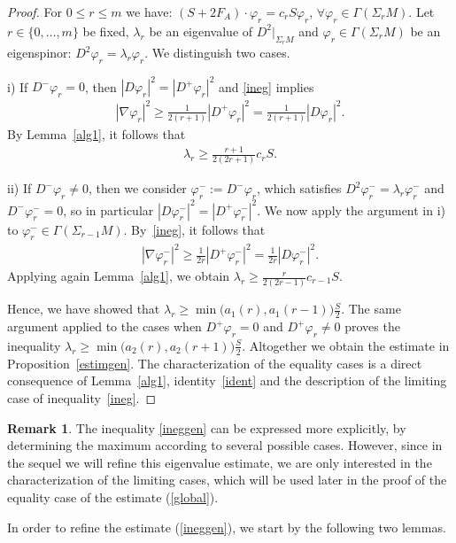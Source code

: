 \documentclass[pdftex]{sigma}
\numberwithin{equation}{section}
\theoremstyle{definition}
\newtheorem{Remark}[thm]{Remark}
\begin{document}
\begin{proof}
For $0\leq r\leq m$ we have: $(S +2 F_A )\cdot \varphi_r = c_r S  \varphi_r$, $\forall\varphi_r\in\Gamma(\Sigma_{r}M)$. Let $r\in\{0,\dots,m\}$ be f\/ixed, $\lambda_r$ be an eigenvalue of $D^2|_{\Sigma_r M}$ and $\varphi_r\in\Gamma(\Sigma_{r}M)$ be an eigenspinor: $D^2\varphi_r=\lambda_r\varphi_r$. We distinguish two cases.

i) If $D^-\varphi_r=0$, then $|D\varphi_r|^2=|D^+\varphi_r|^2$ and \eqref{ineg} implies
\begin{gather*}
|\nabla\varphi_r|^2\geq \frac{1}{2(r+1)}|D^+\varphi_r|^2=\frac{1}{2(r+1)}|D\varphi_r|^2.
\end{gather*}
By Lemma~\ref{alg1},  it follows that
\begin{gather*}\lambda_r\geq\frac{r+1}{2(2r+1)}c_rS. \end{gather*}

 ii) If $D^-\varphi_r\neq 0$, then we consider $\varphi_r^-:= D^-\varphi_r$, which satisf\/ies $D^2\varphi_r^-=\lambda_r\varphi_r^-$ and $D^-\varphi_r^-=0$,  so in particular $|D\varphi_r^-|^2=|D^+\varphi_r^-|^2$. We now apply the argument in i) to $\varphi_r^-\in\Gamma(\Sigma_{r-1}M)$. By~\eqref{ineg}, it follows that
\begin{gather*}
|\nabla\varphi_r^-|^2\geq \frac{1}{2r}|D^+\varphi_r^-|^2=\frac{1}{2r}|D\varphi_r^-|^2.
\end{gather*}
Applying again Lemma~\ref{alg1}, we obtain $\lambda_r\geq\frac{r}{2(2r-1)} c_{r-1} S$.


Hence, we  have showed that $\lambda_r\geq \min\big (a_1(r), a_1(r-1)\big)\frac{S}{2}$. The same argument applied to the cases when $D^+\varphi_r=0$ and $D^+\varphi_r\neq 0$ proves the inequality $\lambda_r\geq \min\big (a_2(r), a_2(r+1)\big ) \frac{S}{2}$. Altogether we obtain the estimate in Proposition~\ref{estimgen}. The characterization of the equality cases is a direct consequence of Lemma~\ref{alg1}, identity~\eqref{ident} and the description of  the limiting case of inequality~\eqref{ineg}.
\end{proof}

\begin{Remark}
The inequality \eqref{ineggen} can be expressed more explicitly, by determining the maximum according to several possible cases. However, since in the sequel we will ref\/ine this eigenvalue estimate, we are only interested in the characterization of the limiting cases, which will be used later in the proof of  the equality case of the estimate (\ref{global}).
\end{Remark}
In order to ref\/ine the estimate (\ref{ineggen}), we start by the following two lemmas.
\end{document}
